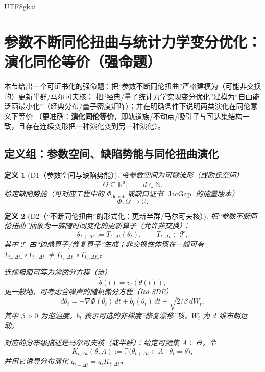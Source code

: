 \documentclass[12pt]{article}
\newtheorem{definition}{定义}[section]
\newcommand{\RR}{\mathbb{R}}
\newcommand{\NN}{\mathbb{N}}
\newcommand{\JacGap}{\operatorname{JacGap}}
\begin{document}
\begin{CJK*}{UTF8}{gkai}
\section{参数不断同伦扭曲与统计力学变分优化：演化同伦等价（强命题）}
\label{sec:tex27-ch8-homotopy-statmech}

本节给出一个可证书化的强命题：把“参数不断同伦扭曲”严格建模为（可能非交换的）更新半群/马尔可夫核；
把“经典/量子统计力学实现变分优化”建模为“自由能泛函最小化”（经典分布/量子密度矩阵）；并在明确条件下说明两类演化在同伦意义下等价
（更准确：\textbf{演化同伦等价}，即轨道族/不动点/吸引子与可达集结构一致，且存在连续变形把一种演化变到另一种演化）。

\subsection{定义组：参数空间、缺陷势能与同伦扭曲演化}
\label{subsec:tex27-ch8-defs}

\begin{definition}[D1（参数空间与缺陷势能）]
\label{def:tex27-ch8-d1}
令参数空间为可微流形（或欧氏空间）
\[
  \Theta \subseteq \RR^d,
  \qquad
  d\in\NN.
\]
给定缺陷势能（可对应工程中的 $\Phi_{\mathrm{defect}}$ 或缺口证书 $\JacGap$ 的能量版本）
\[
  \Phi:\Theta\to\RR.
\]
\end{definition}

\begin{definition}[D2（“不断同伦扭曲”的形式化：更新半群/马尔可夫核）]
\label{def:tex27-ch8-d2}
把“参数不断同伦扭曲”抽象为一族随时间变化的更新算子（允许非交换）：
\[
  \theta_{t+\Delta t}:=T_{t,\Delta t}(\theta_t),
  \qquad
  T_{t,\Delta t}\in\mathcal{T},
\]
其中 $\mathcal{T}$ 由“边缘算子/修复算子”生成；非交换性体现在一般可有
$T_{t_2,\Delta t_2}\circ T_{t_1,\Delta t_1}\neq T_{t_1,\Delta t_1}\circ T_{t_2,\Delta t_2}$。

连续极限可写为常微分方程（流）
\[
  \dot{\theta}(t)=v_t(\theta(t)),
\]
更一般地，可考虑含噪声的随机微分方程（It\^o SDE）
\[
  d\theta_t = -\nabla \Phi(\theta_t)\,dt + b_t(\theta_t)\,dt + \sqrt{2/\beta}\,dW_t,
\]
其中 $\beta>0$ 为逆温度，$b_t$ 表示可选的非梯度“修复漂移”项，$W_t$ 为 $d$ 维布朗运动。

对应的分布级描述是马尔可夫核（或半群）：给定可测集 $A\subseteq\Theta$，令
\[
  K_{t,\Delta t}(\theta,A):=\mathbb{P}\bigl(\theta_{t+\Delta t}\in A \mid \theta_t=\theta\bigr),
\]
并用它诱导分布演化 $q_{t+\Delta t}=q_t K_{t,\Delta t}$。
\end{definition}


\end{CJK*}
\end{document}
